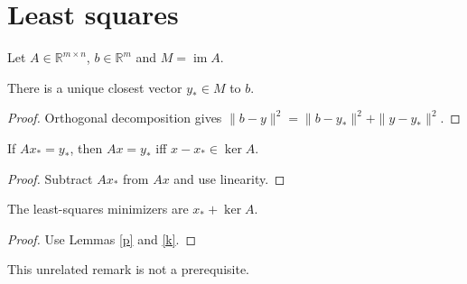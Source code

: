 \section{Least squares}
\begin{definition}\label{d}Let $A\in\mathbb R^{m\times n}$, $b\in\mathbb R^m$ and $M=\operatorname{im}A$.\end{definition}
\begin{lemma}\label{p}There is a unique closest vector $y_*\in M$ to $b$.\end{lemma}
\begin{proof}Orthogonal decomposition gives $\|b-y\|^2=\|b-y_*\|^2+\|y-y_*\|^2$.\end{proof}
\begin{lemma}\label{k}If $Ax_*=y_*$, then $Ax=y_*$ iff $x-x_*\in\ker A$.\end{lemma}
\begin{proof}Subtract $Ax_*$ from $Ax$ and use linearity.\end{proof}
\begin{theorem}\label{t}The least-squares minimizers are $x_*+\ker A$.\end{theorem}
\begin{proof}Use Lemmas \ref{p} and \ref{k}.\end{proof}
\begin{remark}This unrelated remark is not a prerequisite.\end{remark}
